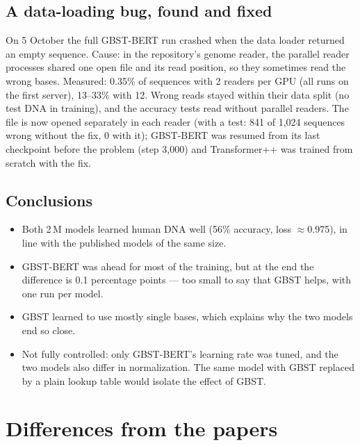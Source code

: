 \documentclass[11pt,a4paper]{article}
\begin{document}
\subsection*{A data-loading bug, found and fixed}
On 5 October the full GBST-BERT run crashed when the data loader returned an empty sequence.
Cause: in the repository's genome reader, the parallel reader processes shared one open file and
its read position, so they sometimes read the wrong bases. Measured: 0.35\% of sequences with 2
readers per GPU (all runs on the first server), 13--33\% with 12. Wrong reads stayed within their
data split (no test DNA in training), and the accuracy tests read without parallel readers. The
file is now opened separately in each reader (with a test: 841 of 1,024 sequences wrong without the
fix, 0 with it); GBST-BERT was resumed from its last checkpoint before the problem (step 3,000) and
Transformer++ was trained from scratch with the fix.

\subsection*{Conclusions}
\begin{itemize}
\item Both 2\,M models learned human DNA well (56\% accuracy, loss $\approx$0.975), in line with
  the published models of the same size.
\item GBST-BERT was ahead for most of the training, but at the end the difference is 0.1
  percentage points --- too small to say that GBST helps, with one run per model.
\item GBST learned to use mostly single bases, which explains why the two models end so close.
\item Not fully controlled: only GBST-BERT's learning rate was tuned, and the two models also
  differ in normalization. The same model with GBST replaced by a plain lookup table would
  isolate the effect of GBST.
\end{itemize}

\section{Differences from the papers}
\end{document}
